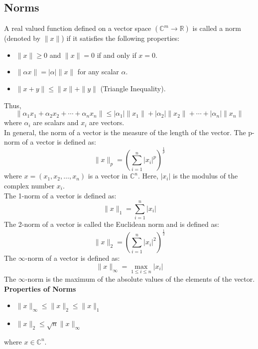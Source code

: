 \subsection{Norms}
\begin{definition}
    A real valued function defined on a vector space $(\mathbb{C}^m \rightarrow \mathbb{R})$ is called a norm (denoted by $\|x\|$) 
    if it satisfies the following properties:
    \begin{itemize}
        \item $\|x\| \geq 0$ and $\|x\|=0$ if and only if $x=0$.
        \item $\|\alpha x\|=|\alpha|\|x\|$ for any scalar $\alpha$.
        \item $\|x+y\| \leq \|x\|+\|y\|$ (Triangle Inequality).
    \end{itemize}
\end{definition}
Thus, 
\[\|\alpha_1x_1+\alpha_2x_2 + \cdots +\alpha_n x_n\| \leq |\alpha_1|\|x_1\|+|\alpha_2|\|x_2\| + \cdots + |\alpha_n|\|x_n\| \]
where $\alpha_i$ are scalars and $x_i$ are vectors.\\
In general, the norm of a vector is the measure of the length of the vector.
The p-norm of a vector is defined as:
\[ \|x\|_p=(\sum_{i=1}^n |x_i|^p)^{\frac{1}{p}} \]
where $x=(x_1,x_2,\ldots,x_n)$ is a vector in $\mathbb{C}^n$. Here, $|x_i|$ is the modulus of the complex number $x_i$.\\
The 1-norm of a vector is defined as:
\[ \|x\|_1=\sum_{i=1}^n |x_i| \]
The 2-norm of a vector is called the Euclidean norm and is defined as:
\[ \|x\|_2=(\sum_{i=1}^n |x_i|^2)^{\frac{1}{2}} \]
The $\infty$-norm of a vector is defined as:
\[ \|x\|_{\infty}=\max_{1\leq i \leq n} |x_i| \]
The $\infty$-norm is the maximum of the absolute values of the elements of the vector.\\

\textbf{Properties of Norms}
\begin{itemize}
    \item $\|x\|_{\infty} \leq \|x\|_2 \leq \|x\|_1$
    \item $\|x\|_2 \leq \sqrt{n}\|x\|_{\infty}$
\end{itemize}
where $x \in \mathbb{C}^n$.\\


